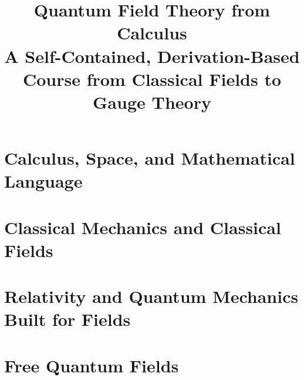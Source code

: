 \documentclass[11pt,oneside]{book}
\title{\Huge Quantum Field Theory from Calculus\\[0.45em]
\Large A Self-Contained, Derivation-Based Course from Classical Fields to Gauge Theory}
\author{}
\date{}
\begin{document}
\frontmatter
\hypersetup{pageanchor=false}

\clearpage
\hypersetup{pageanchor=true}
\setcounter{page}{1}

\tableofcontents

\mainmatter
\part{Calculus, Space, and Mathematical Language}








\part{Classical Mechanics and Classical Fields}








\part{Relativity and Quantum Mechanics Built for Fields}








\part{Free Quantum Fields}








\end{document}
